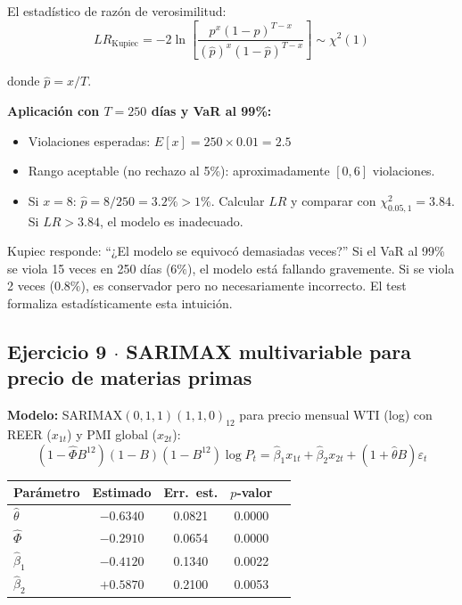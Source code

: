 \documentclass[11pt,a4paper]{article}
\newcommand{\eps}{\varepsilon}
\begin{document}
El estadístico de razón de verosimilitud:
\[
LR_{\text{Kupiec}} = -2\ln\!\left[\frac{p^x(1-p)^{T-x}}{(\hat{p})^x(1-\hat{p})^{T-x}}\right] \sim \chi^2(1)
\]

donde $\hat{p}=x/T$.

\textbf{Aplicación con $T=250$ días y VaR al 99\%:}
\begin{itemize}[leftmargin=*]
  \item Violaciones esperadas: $E[x]=250\times 0.01=2.5$
  \item Rango aceptable (no rechazo al 5\%): aproximadamente $[0, 6]$ violaciones.
  \item Si $x=8$: $\hat{p}=8/250=3.2\%>1\%$. Calcular $LR$ y comparar con $\chi^2_{0.05,1}=3.84$. Si $LR>3.84$, el modelo es inadecuado.
\end{itemize}

\begin{cajaPista}
Kupiec responde: ``¿El modelo se equivocó demasiadas veces?'' Si el VaR al 99\% se viola 15 veces en 250 días ($6\%$), el modelo está fallando gravemente. Si se viola 2 veces ($0.8\%$), es conservador pero no necesariamente incorrecto. El test formaliza estadísticamente esta intuición.
\end{cajaPista}

\subsection*{Ejercicio 9 \texorpdfstring{$\cdot$}{·} SARIMAX multivariable para precio de materias primas}

\textbf{Modelo:} SARIMAX$(0,1,1)(1,1,0)_{12}$ para precio mensual WTI (log) con REER ($x_{1t}$) y PMI global ($x_{2t}$):
\[
(1-\hat{\Phi}B^{12})(1-B)(1-B^{12})\log P_t = \hat{\beta}_1 x_{1t} + \hat{\beta}_2 x_{2t} + (1+\hat{\theta}B)\eps_t
\]

\begin{center}
\begin{tabular}{@{}lcccc@{}}
\toprule
Parámetro & Estimado & Err.\ est. & $p$-valor \\
\midrule
$\hat{\theta}$  & $-0.6340$ & 0.0821 & 0.0000 \\
$\hat{\Phi}$    & $-0.2910$ & 0.0654 & 0.0000 \\
$\hat{\beta}_1$ & $-0.4120$ & 0.1340 & 0.0022 \\
$\hat{\beta}_2$ & $+0.5870$ & 0.2100 & 0.0053 \\
\bottomrule
\end{tabular}
\end{center}
\end{document}
